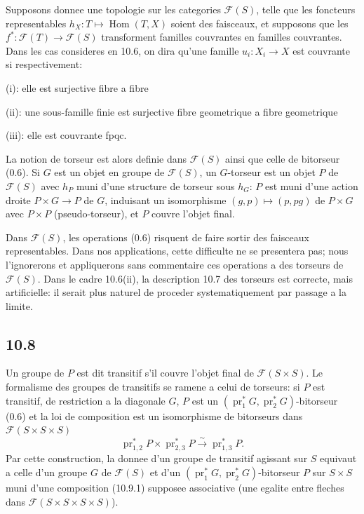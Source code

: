 \documentclass[12pt,a4paper]{article}
\theoremstyle{plain}
\theoremstyle{definition}
\theoremstyle{remark}
\DeclareMathOperator{\Hom}{Hom}
\DeclareMathOperator{\pr}{pr}
\begin{document}
Supposons donnee une topologie sur les categories $\mathcal{F}(S)$, telle que les foncteurs representables $h_X: T \mapsto \Hom(T, X)$ soient des faisceaux, et supposons que les $f^*: \mathcal{F}(T) \to \mathcal{F}(S)$ transforment familles couvrantes en familles couvrantes. Dans les cas consideres en 10.6, on dira qu'une famille $u_i: X_i \to X$ est couvrante si respectivement:

(i): elle est surjective fibre a fibre

(ii): une sous-famille finie est surjective fibre geometrique a fibre geometrique

(iii): elle est couvrante fpqc.

La notion de torseur est alors definie dans $\mathcal{F}(S)$ ainsi que celle de bitorseur (0.6). Si $G$ est un objet en groupe de $\mathcal{F}(S)$, un $G$-torseur est un objet $P$ de $\mathcal{F}(S)$ avec $h_P$ muni d'une structure de torseur sous $h_G$: $P$ est muni d'une action droite $P \times G \to P$ de $G$, induisant un isomorphisme $(g,p) \mapsto (p, pg)$ de $P \times G$ avec $P \times P$ (pseudo-torseur), et $P$ couvre l'objet final.

Dans $\mathcal{F}(S)$, les operations (0.6) risquent de faire sortir des faisceaux representables. Dans nos applications, cette difficulte ne se presentera pas; nous l'ignorerons et appliquerons sans commentaire ces operations a des torseurs de $\mathcal{F}(S)$. Dans le cadre 10.6(ii), la description 10.7 des torseurs est correcte, mais artificielle: il serait plus naturel de proceder systematiquement par passage a la limite.

\subsection*{10.8}

Un groupe de $P$ est dit transitif s'il couvre l'objet final de $\mathcal{F}(S \times S)$. Le formalisme des groupes de transitifs se ramene a celui de torseurs: si $P$ est transitif, de restriction a la diagonale $G$, $P$ est un $(\pr_1^* G, \pr_2^* G)$-bitorseur (0.6) et la loi de composition est un isomorphisme de bitorseurs dans $\mathcal{F}(S \times S \times S)$
\begin{equation}\label{10.8.1}
\pr_{1,2}^* P \times \pr_{2,3}^* P \xrightarrow{\sim} \pr_{1,3}^* P. \tag{10.8.1}
\end{equation}
Par cette construction, la donnee d'un groupe de transitif agissant sur $S$ equivaut a celle d'un groupe $G$ de $\mathcal{F}(S)$ et d'un $(\pr_1^* G, \pr_2^* G)$-bitorseur $P$ sur $S \times S$ muni d'une composition (10.9.1) supposee associative (une egalite entre fleches dans $\mathcal{F}(S \times S \times S \times S)$).
\end{document}
